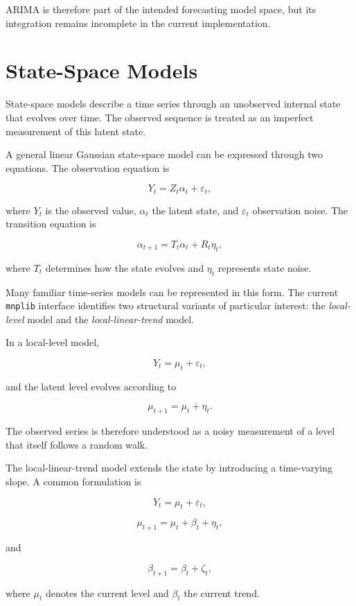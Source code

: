 ARIMA is therefore part of the intended forecasting model space, but its
integration remains incomplete in the current implementation.


%
%

\section{State-Space Models}
\label{subsec:automl_state_space}

State-space models describe a time series through an unobserved internal state
that evolves over time. The observed sequence is treated as an imperfect
measurement of this latent state.

A general linear Gaussian state-space model can be expressed through two
equations. The observation equation is

\[
Y_t
=
Z_t\alpha_t+\varepsilon_t,
\]

where \(Y_t\) is the observed value, \(\alpha_t\) the latent state, and
\(\varepsilon_t\) observation noise. The transition equation is

\[
\alpha_{t+1}
=
T_t\alpha_t+R_t\eta_t,
\]

where \(T_t\) determines how the state evolves and \(\eta_t\) represents state
noise.

Many familiar time-series models can be represented in this form. The current
\texttt{mnplib} interface identifies two structural variants of particular
interest: the \emph{local-level} model and the \emph{local-linear-trend} model.

In a local-level model,

\[
Y_t
=
\mu_t+\varepsilon_t,
\]

and the latent level evolves according to

\[
\mu_{t+1}
=
\mu_t+\eta_t.
\]

The observed series is therefore understood as a noisy measurement of a level
that itself follows a random walk.

The local-linear-trend model extends the state by introducing a time-varying
slope. A common formulation is

\[
Y_t
=
\mu_t+\varepsilon_t,
\]

\[
\mu_{t+1}
=
\mu_t+\beta_t+\eta_t,
\]

and

\[
\beta_{t+1}
=
\beta_t+\zeta_t,
\]

where \(\mu_t\) denotes the current level and \(\beta_t\) the current trend.

